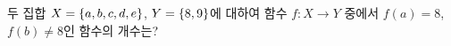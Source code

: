 두 집합 $X=\{a{,}\mkern3mu\mathopen{}b{,}\mkern3mu\mathopen{}c{,}\mkern3mu\mathopen{}d{,}\mkern3mu\mathopen{}e\}$, $Y=\{8{,}\mkern3mu\mathopen{}9\}$에 대하여 함수 $f:X\longrightarrow Y$ 중에서 $f(a)=8$, $f(b)\ne8$인 함수의 개수는?
